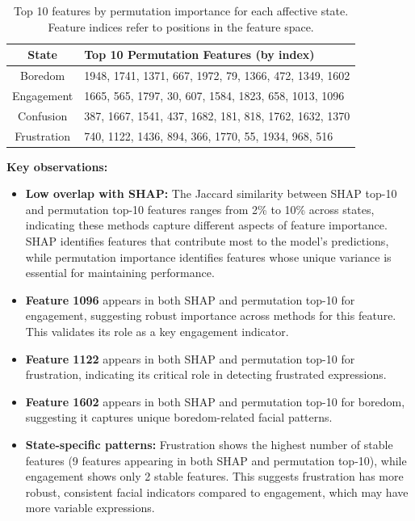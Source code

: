 \begin{table}[t]
\centering
\caption{Top 10 features by permutation importance for each affective state. Feature indices refer to positions in the feature space.}
\label{tab:perm-top-features}
\begin{tabular}{cl}
\toprule
\textbf{State} & \textbf{Top 10 Permutation Features (by index)} \\
\midrule
Boredom & 1948, 1741, 1371, 667, 1972, 79, 1366, 472, 1349, 1602 \\
Engagement & 1665, 565, 1797, 30, 607, 1584, 1823, 658, 1013, 1096 \\
Confusion & 387, 1667, 1541, 437, 1682, 181, 818, 1762, 1632, 1370 \\
Frustration & 740, 1122, 1436, 894, 366, 1770, 55, 1934, 968, 516 \\
\bottomrule
\end{tabular}
\end{table}

\textbf{Key observations:}
\begin{itemize}
    \item \textbf{Low overlap with SHAP:} The Jaccard similarity between SHAP top-10 and permutation top-10 features ranges from 2\% to 10\% across states, indicating these methods capture different aspects of feature importance. SHAP identifies features that contribute most to the model's predictions, while permutation importance identifies features whose unique variance is essential for maintaining performance.

    \item \textbf{Feature 1096} appears in both SHAP and permutation top-10 for engagement, suggesting robust importance across methods for this feature. This validates its role as a key engagement indicator.
    
    \item \textbf{Feature 1122} appears in both SHAP and permutation top-10 for frustration, indicating its critical role in detecting frustrated expressions.
    
    \item \textbf{Feature 1602} appears in both SHAP and permutation top-10 for boredom, suggesting it captures unique boredom-related facial patterns.

    \item \textbf{State-specific patterns:} Frustration shows the highest number of stable features (9 features appearing in both SHAP and permutation top-10), while engagement shows only 2 stable features. This suggests frustration has more robust, consistent facial indicators compared to engagement, which may have more variable expressions.
\end{itemize}

